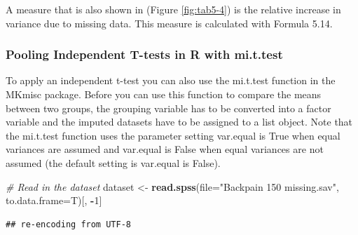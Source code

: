 \documentclass[]{book}
\newenvironment{Shaded}{\begin{snugshade}}{\end{snugshade}}
\newcommand{\KeywordTok}[1]{\textcolor[rgb]{0.13,0.29,0.53}{\textbf{#1}}}
\newcommand{\DataTypeTok}[1]{\textcolor[rgb]{0.13,0.29,0.53}{#1}}
\newcommand{\DecValTok}[1]{\textcolor[rgb]{0.00,0.00,0.81}{#1}}
\newcommand{\StringTok}[1]{\textcolor[rgb]{0.31,0.60,0.02}{#1}}
\newcommand{\CommentTok}[1]{\textcolor[rgb]{0.56,0.35,0.01}{\textit{#1}}}
\newcommand{\OperatorTok}[1]{\textcolor[rgb]{0.81,0.36,0.00}{\textbf{#1}}}
\newcommand{\NormalTok}[1]{#1}
\theoremstyle{definition}
\theoremstyle{definition}
\theoremstyle{definition}
\theoremstyle{remark}
\begin{document}
A measure that is also shown in (Figure \ref{fig:tab5-4}) is the
relative increase in variance due to missing data. This measure is
calculated with Formula 5.14.

\subsubsection{Pooling Independent T-tests in R with
mi.t.test}\label{pooling-independent-t-tests-in-r-with-mi.t.test}

To apply an independent t-test you can also use the mi.t.test function
in the MKmisc package. Before you can use this function to compare the
means between two groups, the grouping variable has to be converted into
a factor variable and the imputed datasets have to be assigned to a list
object. Note that the mi.t.test function uses the parameter setting
var.equal is True when equal variances are assumed and var.equal is
False when equal variances are not assumed (the default setting is
var.equal is False).

\begin{Shaded}
\begin{Highlighting}[]
\CommentTok{# Read in the dataset}
\NormalTok{dataset <-}\StringTok{ }\KeywordTok{read.spss}\NormalTok{(}\DataTypeTok{file=}\StringTok{"Backpain 150 missing.sav"}\NormalTok{, }\DataTypeTok{to.data.frame=}\NormalTok{T)[, }\OperatorTok{-}\DecValTok{1}\NormalTok{]}
\end{Highlighting}
\end{Shaded}

\begin{verbatim}
## re-encoding from UTF-8
\end{verbatim}
\end{document}
